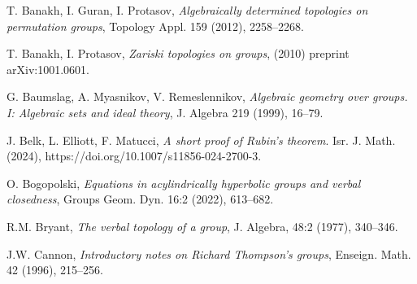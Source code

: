 \documentclass[11pt]{amsart}
\theoremstyle{definition}
\begin{document}
\begin{thebibliography}{}

T. Banakh, I. Guran, I. Protasov, {\em Algebraically determined topologies on permutation groups}, Topology Appl. 159 (2012), 2258--2268.

T. Banakh, I. Protasov, {\em Zariski topologies on groups}, (2010) preprint arXiv:1001.0601.



G. Baumslag, A. Myasnikov, V. Remeslennikov, {\em Algebraic geometry over groups. I: Algebraic sets and ideal theory},
J. Algebra 219 (1999), 16--79.


J. Belk, L. Elliott,  F. Matucci, {\em A short proof of Rubin’s theorem}. Isr. J. Math. (2024), https://doi.org/10.1007/s11856-024-2700-3.


O. Bogopolski, {\em Equations in acylindrically hyperbolic groups and verbal closedness}, 
Groups Geom. Dyn. 16:2 (2022), 613--682.


R.M. Bryant, {\em The verbal topology of a group}, 
J. Algebra, 48:2 (1977), 340--346.




J.W. Cannon,  {\em Introductory notes on Richard Thompson’s groups}, Enseign. Math. 42 (1996), 215--256.

	
	


\end{thebibliography}
\end{document}
